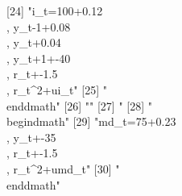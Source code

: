 [24] "{i_{t}}=100+0.12\\, {y_{t-1}}+0.08\\, {y_{t}}+0.04\\, {y_{t+1}}+-40\\, {r_{t}}+-1.5\\, {r_{t}}^{2}+{ui_{t}}"                                                                                                                                                                                                                                 
[25] "\\end{dmath}"                                                                                                                                                                                                                                                                                                                                
[26] ""                                                                                                                                                                                                                                                                                                                                            
[27] "%
[28] "\\begin{dmath}"                                                                                                                                                                                                                                                                                                                              
[29] "{md_{t}}=75+0.23\\, {y_{t}}+-35\\, {r_{t}}+-1.5\\, {r_{t}}^{2}+{umd_{t}}"                                                                                                                                                                                                                                                                    
[30] "\\end{dmath}"                                                                                                                                                                                                                                                                                                                                

